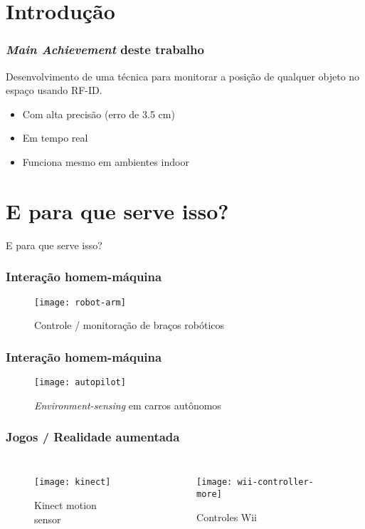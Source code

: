 \section{Introdução}


\begin{frame}
  \frametitle{\emph{Main Achievement} deste trabalho}

    Desenvolvimento de uma técnica para \alert{monitorar a posição de qualquer objeto no espaço usando RF-ID}.

    \begin{itemize}
      \item Com \alert{alta precisão} (erro de 3.5 cm)
      \item Em \alert{tempo real}
      \item Funciona mesmo em ambientes \alert{indoor}
    \end{itemize}
\end{frame}

\section{E para que serve isso?}

\begin{frame}
  \begin{center}
    \Huge E para que serve isso?
  \end{center}
\end{frame}

\begin{frame}
  \frametitle{Interação homem-máquina}
  \begin{figure}
    \texttt{[image: robot-arm]}
		\caption*{Controle / monitoração de braços robóticos}
  \end{figure}
\end{frame}

\begin{frame}
  \frametitle{Interação homem-máquina}
  \begin{figure}
    \texttt{[image: autopilot]}
		\caption*{\emph{Environment-sensing} em carros autônomos}
  \end{figure}
\end{frame}

\begin{frame}
  \frametitle{Jogos / Realidade aumentada}
    \begin{columns}[T,onlytextwidth]
					\begin{figure}
							\texttt{[image: kinect]}
						\captionsetup{labelformat=empty}
						\caption{Kinect motion sensor}
					\end{figure}

					\begin{figure}
							\texttt{[image: wii-controller-more]}
						\captionsetup{labelformat=empty}
						\caption{Controles Wii}
					\end{figure}
    \end{columns}
\end{frame}

